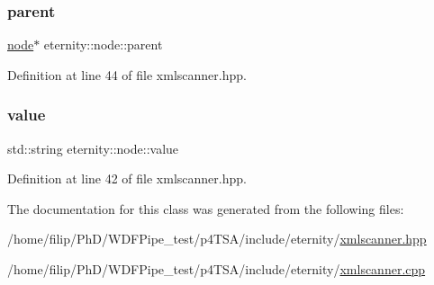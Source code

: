 \subsubsection{\texorpdfstring{parent}{parent}}
{\footnotesize\ttfamily \hyperlink{classeternity_1_1node}{node}$\ast$ eternity\+::node\+::parent}



Definition at line 44 of file xmlscanner.\+hpp.

\mbox{\label{classeternity_1_1node_a8daefdb6d1fffd05b08a2f8e07c9ffb4}} 
\subsubsection{\texorpdfstring{value}{value}}
{\footnotesize\ttfamily std\+::string eternity\+::node\+::value}



Definition at line 42 of file xmlscanner.\+hpp.



The documentation for this class was generated from the following files\+:\begin{DoxyCompactItemize}
\item 
/home/filip/\+Ph\+D/\+W\+D\+F\+Pipe\+\_\+test/p4\+T\+S\+A/include/eternity/\hyperlink{xmlscanner_8hpp}{xmlscanner.\+hpp}\item 
/home/filip/\+Ph\+D/\+W\+D\+F\+Pipe\+\_\+test/p4\+T\+S\+A/include/eternity/\hyperlink{xmlscanner_8cpp}{xmlscanner.\+cpp}\end{DoxyCompactItemize}
